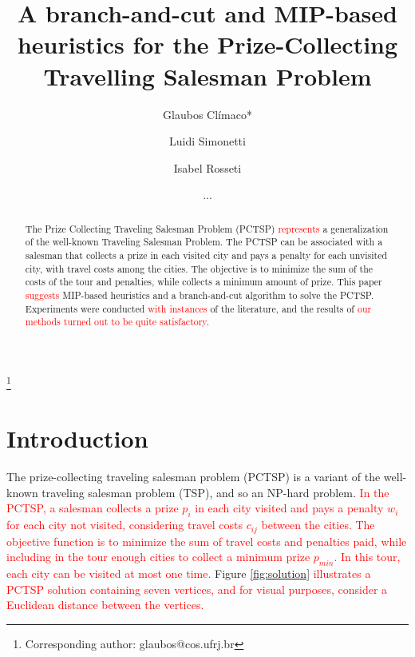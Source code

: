 \documentclass{ro}
\begin{document}
\title{A branch-and-cut and MIP-based heuristics for the Prize-Collecting Travelling Salesman Problem}%
%
\author{Glaubos Cl\'imaco*}\address{Universidade Federal do Rio de Janeiro, PESC-COPPE, Cidade Universit\'aria, Centro de Tecnologia, Bloco H, 21941-972, Rio de Janeiro, Brasil.}\thanks{Corresponding author: glaubos@cos.ufrj.br}
\author{Luidi Simonetti}\address{Universidade Federal do Rio de Janeiro, PESC-COPPE, Cidade Universit\'aria, Centro de Tecnologia, Bloco H, 21941-972, Rio de Janeiro, Brasil.}
\author{Isabel Rosseti}\address{ Universidade Federal Fluminense, Instituto de Computa\c{c}\~ao. Rua Passo da P\'atria 156 S\~ao Domingos 24210-240 - Niter\'oi, RJ - Brasil}
%
\date{...}
%
\begin{abstract} 

The Prize Collecting Traveling Salesman Problem
(PCTSP) \textcolor{red}{represents} a generalization of the well-known Traveling Salesman Problem. The PCTSP can be associated with a salesman that collects a prize in each visited city and pays a penalty for each unvisited city, with travel costs among the cities. The
objective is to minimize the sum of the costs of the tour
and penalties, while collects a minimum amount of prize.
This paper \textcolor{red}{suggests} MIP-based heuristics and a branch-and-cut algorithm to solve the PCTSP. Experiments were conducted \textcolor{red}{with instances} of the literature, and the results of \textcolor{red}{our methods turned out to be quite satisfactory}.

 \end{abstract}
%


%
%
\maketitle
\section{Introduction}

The prize-collecting traveling salesman problem (PCTSP) is a variant of the well-known traveling salesman problem (TSP), and so an NP-hard problem. \textcolor{red}{In the PCTSP,  a salesman collects a prize $p_i$ in each city visited and pays a penalty $w_i$ for each city not visited, considering travel
costs $c_{ij}$ between the cities. The objective function is to minimize the sum of travel
costs and penalties paid, while including in the tour enough cities to collect a 
minimum prize $p_{min}$. In this tour, each city can be visited at most one time.}  Figure \ref{fig:solution} \textcolor{red}{illustrates a PCTSP solution containing seven vertices, and for visual purposes, consider a Euclidean distance between the vertices.}
\end{document}

